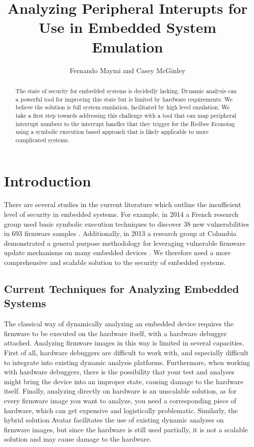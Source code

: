 \documentclass[letterpaper, 10 pt, conference]{ieeeconf}
\title{\LARGE \bf
Analyzing Peripheral Interupts for Use in Embedded System Emulation
}
\author{Fernando Maymi and Casey McGinley}
\begin{document}
\maketitle
\thispagestyle{empty}
\pagestyle{empty}

\begin{abstract}%
The state of security for embedded systems is decidedly lacking. Dynamic analysis can a powerful tool for improving this state but is limited by hardware requirements. We believe the solution is full system emulation, facilitated by high level emulation. We take a first step towards addressing this challenge with a tool that can map peripheral interrupt numbers to the interrupt handler that they trigger for the Redbee Econotag using a symbolic execution based approach that is likely applicable to more complicated systems.
\end{abstract}

\section{Introduction}\label{intro}
There are several studies in the current literature which outline the insufficient level of security in embedded systems. For example, in 2014 a French research group used basic symbolic execution techniques to discover 38 new vulnerabilities in 693 firmware samples \cite{acostin}. Additionally, in 2013 a research group at Columbia demonstrated a general purpose methodology for leveraging vulnerable firmware update mechanisms on many embedded devices \cite{acui}. We therefore need a more comprehensive and scalable solution to the security of embedded systems.

\subsection{Current Techniques for Analyzing Embedded Systems} \label{current}
The classical way of dynamically analyzing an embedded device requires the firmware to be executed on the hardware itself, with a hardware debugger attached. Analyzing firmware images in this way is limited in several capacities. First of all, hardware debuggers are difficult to work with, and especially difficult to integrate into existing dynamic analysis platforms. Furthermore, when working with hardware debuggers, there is the possibility that your test and analyses might bring the device into an improper state, causing damage to the hardware itself. Finally, analyzing directly on hardware is an unscalable solution, as for every firmware image you want to analyze, you need a corresponding piece of hardware, which can get expensive and logistically problematic. Similarly, the hybrid solution Avatar \cite{avatar} facilitates the use of existing dynamic analyses on firmware images, but since the hardware is still used partially, it is not a scalable solution and may cause damage to the hardware.
\end{document}
